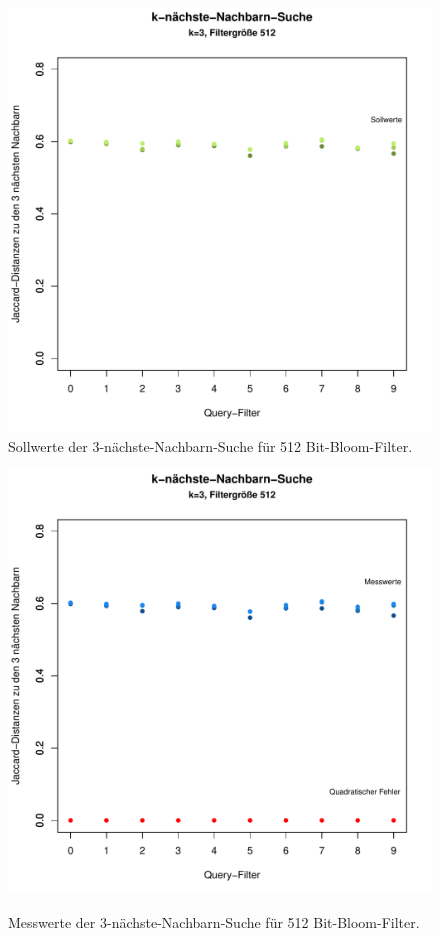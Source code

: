 \begin{figure}[hptb]
	\centering
	\includegraphics[scale=0.7]{pictures/nn3_512-1.pdf}\\
	\caption[Sollwerte der 3-nächste-Nachbarn-Suche für 512 Bit-Bloom-Filter]{Sollwerte der 3-nächste-Nachbarn-Suche für 512 Bit-Bloom-Filter.}\label{fig:pic11}
	\includegraphics[scale=0.7]{pictures/nn3_512-2.pdf}\\
	\caption[Messwerte der 3-nächste-Nachbarn-Suche für 512 Bit-Bloom-Filter]{Messwerte der 3-nächste-Nachbarn-Suche für 512 Bit-Bloom-Filter.}\label{fig:pic12}
\end{figure}
